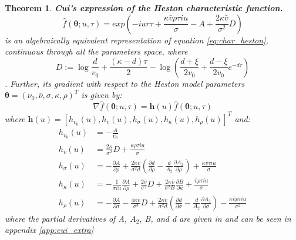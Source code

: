 \documentclass[12,twoside]{mammeTFM}
\newtheorem{thm}{Theorem}[section]
\theoremstyle{definition}
\theoremstyle{remark}
\begin{document}
\begin{thm}\label{theorem:cui} \textbf{Cui's expression of the Heston characteristic function.}
\begin{equation} \label{eq:char_cui}
\hat{f}(\boldsymbol{\theta}; u, \tau) = exp \left(-i u r \tau + \dfrac{\kappa \bar{v} \rho \tau i u}{\sigma}-A + \dfrac{2 \kappa \bar{v}}{\sigma^{2}}D \right)
\end{equation}
is an algebraically equivalent representation of equation \ref{eq:char_heston}, continuous through all the parameters space, where
\begin{equation}
D := \log \frac{d}{v_{0}}+\frac{(\kappa-d) \tau}{2}-\log \left(\frac{d+\xi}{2 v_{0}}+\frac{d-\xi}{2 v_{0}} e^{-d \tau}\right)
\end{equation}
. Further, its gradient with respect to the Heston model parameters $\boldsymbol{\theta} = (\nu_0, \overline{\nu}, \sigma, \kappa, \rho)^{T}$ is given by:
\begin{equation}
\nabla \hat{f}(\boldsymbol{\theta}; u, \tau) = \boldsymbol{h}(u) \hat{f}(\boldsymbol{\theta}; u, \tau)
\end{equation}
where $\boldsymbol{h}(u) = [h_{v_0}(u), h_{\overline{v}}(u), h_\sigma(u), h_\kappa(u), h_\rho(u)]^T$ and:
\begin{align}
h_{v_0}(u)& =-\frac{A}{v_{0}} \\
h_{\overline{v}}(u)& =\frac{2 \kappa}{\sigma^{2}} D+\frac{\kappa \rho \tau i u}{\sigma} \\
h_{\sigma}(u)& =-\frac{\partial A}{\partial \rho}+\frac{2 \kappa \bar{v}}{\sigma^{2} d}\left(\frac{\partial d}{\partial \rho}-\frac{d}{A_{2}} \frac{\partial A_{2}}{\partial \rho}\right)+\frac{\kappa \bar{v} \tau i u}{\sigma} \\
h_{\kappa}(u)& =-\frac{1}{\sigma i u} \frac{\partial A}{\partial \rho}+\frac{2 \bar{v}}{\sigma^{2}} D+\frac{2 \kappa \bar{v}}{\sigma^{2} B} \frac{\partial B}{\partial \kappa}+\frac{\bar{v} \rho \tau i u}{\sigma} \\
h_{\rho}(u)& =-\frac{\partial A}{\partial \sigma}-\frac{4 \kappa \bar{v}}{\sigma^{3}} D+\frac{2 \kappa \bar{v}}{\sigma^{2} d}\left(\frac{\partial d}{\partial \sigma}-\frac{d}{A_{2}} \frac{\partial A_{2}}{\partial \sigma}\right)-\frac{\kappa \bar{v} \rho \tau i u}{\sigma^{2}}
\end{align}
where the partial derivatives of A, $A_2$, B, and d are given in \cite{cui17} and can be seen in appendix \ref{app:cui_extra}
\end{thm}

\end{document}
